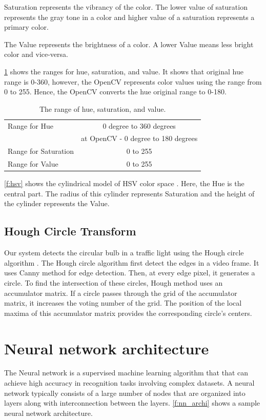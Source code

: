 Saturation represents the vibrancy of the color.
The lower value of saturation represents the gray tone in a color and higher value of a saturation represents a primary color.

The Value represents the brightness of a color.
A lower Value means less bright color and vice-versa.

\ref{t:hsv} shows the ranges for hue, saturation, and value.
It shows that original hue range is 0-360, however, the OpenCV \cite{opencv} represents color values using the range from 0 to 255. 
Hence, the OpenCV converts the hue original range to 0-180.

\begin{table}[h!]
  \centering
  \caption{The range of hue, saturation, and value.}
  \label{t:hsv}
  \begin{tabular}{  l  c  }
    \rowcolor{gray!50}
    \hline
    Range for Hue & 0 degree to 360 degrees \\
    \rowcolor{gray!50}    
    & at OpenCV - 0 degree to 180 degrees\\  
    Range for Saturation & 0 to 255 \\
    Range for Value & 0 to 255 \\
    \hline 
    
  \end{tabular}
\end{table}


\ref{f:hsv} shows the cylindrical model of HSV color space \cite{hsv}.
Here, the Hue is the central part.
The radius of this cylinder represents Saturation and the height of the cylinder represents the Value.

\subsection{Hough Circle Transform}
Our system detects the circular bulb in a traffic light using the Hough circle algorithm \cite{houghcir_alg}.
The Hough circle algorithm first detect the edges in a video frame.
It uses Canny method \cite{canny} for edge detection.
Then, at every edge pixel, it generates a circle.
To find the intersection of these circles, Hough method uses an accumulator matrix.
If a circle passes through the grid of the accumulator matrix, it increases the voting number of the grid.
The position of the local maxima of this accumulator matrix provides the corresponding circle's centers.

\section{Neural network architecture}
The Neural network is a supervised machine learning algorithm that that can achieve high accuracy in recognition tasks involving complex datasets. 
A neural network typically consists of a large number of nodes that are organized into layers along with interconnection between the layers. 
\ref{f:nn_archi} shows a sample neural network architecture.

